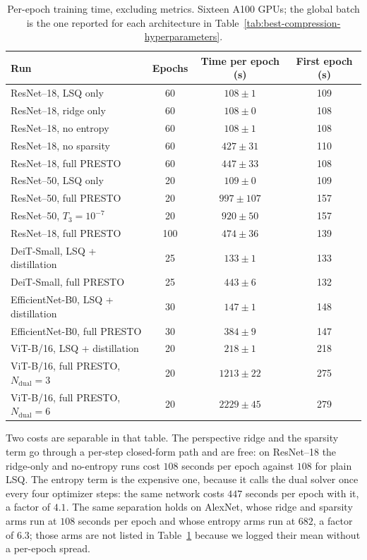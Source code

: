 \documentclass{article}
\begin{document}
\begin{table}[ht]
  \caption{Per-epoch training time, excluding metrics. Sixteen A100 GPUs; the
  global batch is the one reported for each architecture in
  Table~\ref{tab:best-compression-hyperparameters}.}
  \label{tab:cost}
  \centering
  \small
  \setlength{\tabcolsep}{6pt}
  \begin{tabular}{lccc}
    \toprule
    Run & Epochs & Time per epoch (s) & First epoch (s) \\
    \midrule
    ResNet--18, LSQ only & 60 & $108 \pm 1$ & 109 \\
    ResNet--18, ridge only & 60 & $108 \pm 0$ & 108 \\
    ResNet--18, no entropy & 60 & $108 \pm 1$ & 108 \\
    ResNet--18, no sparsity & 60 & $427 \pm 31$ & 110 \\
    ResNet--18, full PRESTO & 60 & $447 \pm 33$ & 108 \\
    ResNet--50, LSQ only & 20 & $109 \pm 0$ & 109 \\
    ResNet--50, full PRESTO & 20 & $997 \pm 107$ & 157 \\
    ResNet--50, $T_3=10^{-7}$ & 20 & $920 \pm 50$ & 157 \\
    ResNet--18, full PRESTO & 100 & $474 \pm 36$ & 139 \\
    DeiT-Small, LSQ + distillation & 25 & $133 \pm 1$ & 133 \\
    DeiT-Small, full PRESTO & 25 & $443 \pm 6$ & 132 \\
    EfficientNet-B0, LSQ + distillation & 30 & $147 \pm 1$ & 148 \\
    EfficientNet-B0, full PRESTO & 30 & $384 \pm 9$ & 147 \\
    ViT-B/16, LSQ + distillation & 20 & $218 \pm 1$ & 218 \\
    ViT-B/16, full PRESTO, $N_{\mathrm{dual}}=3$ & 20 & $1213 \pm 22$ & 275 \\
    ViT-B/16, full PRESTO, $N_{\mathrm{dual}}=6$ & 20 & $2229 \pm 45$ & 279 \\
    \bottomrule
  \end{tabular}
\end{table}

Two costs are separable in that table. The perspective ridge and the sparsity
term go through a per-step closed-form path and are free: on ResNet--18 the
ridge-only and no-entropy runs cost $108$ seconds per epoch against $108$ for
plain LSQ. The entropy term is the expensive one, because it calls the dual
solver once every four optimizer steps: the same network costs $447$ seconds per
epoch with it, a factor of $4.1$. The same separation holds on AlexNet, whose
ridge and sparsity arms run at $108$ seconds per epoch and whose entropy arms run
at $682$, a factor of $6.3$; those arms are not listed in Table~\ref{tab:cost}
because we logged their mean without a per-epoch spread.
\end{document}
